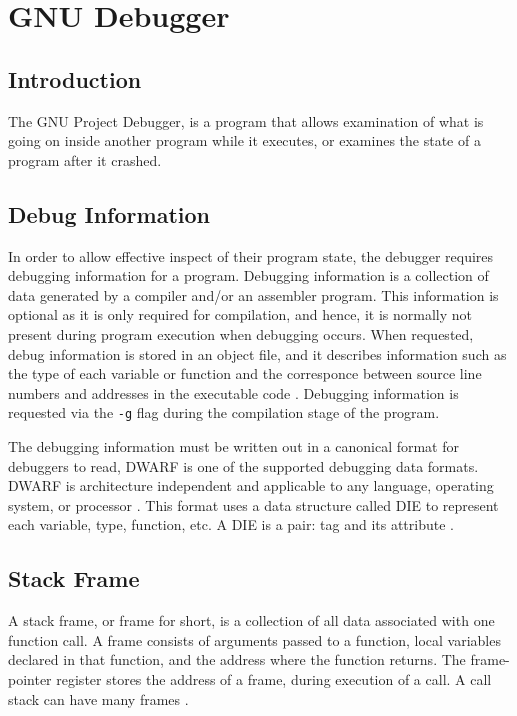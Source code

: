 \chapter{GNU Debugger} \label{GDB}
\section{Introduction}
The GNU Project Debugger, is a program that allows examination of what is going on
inside another program while it executes, or examines the state of a program
after it crashed\cite{reference3}.

\section{Debug Information}
In order to allow effective inspect of their program state, the
debugger requires debugging information for a program. Debugging
information is a collection of data generated by a compiler and/or an assembler
program. This information is optional as it is only required for compilation,
and hence, it is normally not present during program execution when debugging
occurs. When requested, debug information is stored in an object file, and it describes
information such as the type of each variable or function and
the corresponce between source line numbers and addresses in the executable
code \cite{reference6}. Debugging information is requested via the \verb|-g|
flag during the compilation stage of the
program.

The debugging information must be written out in a canonical format for
debuggers to read, DWARF is one of the supported debugging data formats. DWARF is architecture
independent and applicable to any language, operating system, or processor \cite{reference7}. This format uses a data structure called DIE to represent
each variable, type, function, etc. A DIE is a pair: tag
and its attribute \cite{reference8}.

\section{Stack Frame}
A stack frame, or frame for short, is a collection of all data associated with
one function call. A frame consists of arguments passed to a function, local variables declared in that
function, and the address where the
function returns. The frame-pointer register stores the address of a frame,
during execution of a call. A call stack can have many frames \cite{reference12}.

